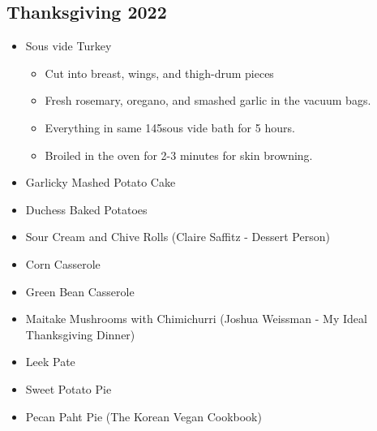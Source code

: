 \subsection*{Thanksgiving 2022}
\begin{itemize}        
	\item Sous vide Turkey
		\begin{itemize}        
			\item Cut into breast, wings, and thigh-drum pieces
			\item Fresh rosemary, oregano, and smashed garlic in the vacuum bags.
			\item Everything in same 145\faren sous vide bath for 5 hours.
			\item Broiled in the oven for 2-3 minutes for skin browning.
		\end{itemize}        
	\item Garlicky Mashed Potato Cake
	\item Duchess Baked Potatoes
	\item Sour Cream and Chive Rolls (Claire Saffitz - Dessert Person)
	\item Corn Casserole
	\item Green Bean Casserole
	\item Maitake Mushrooms with Chimichurri (Joshua Weissman - My Ideal Thanksgiving Dinner)
	\item Leek Pate
	\item Sweet Potato Pie
	\item Pecan Paht Pie (The Korean Vegan Cookbook)
\end{itemize}        
